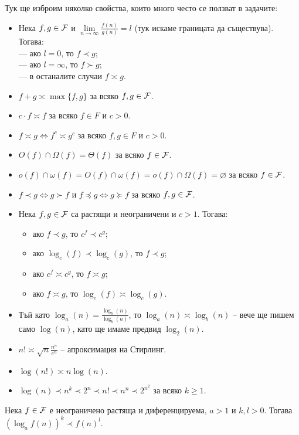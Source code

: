 Тук ще изброим няколко свойства, които много често се ползват в задачите:
\begin{itemize}
  \item Нека $f, g \in \mathcal{F}$ и $\lim\limits_{n \rightarrow \infty} \frac{f(n)}{g(n)} = l$ (тук искаме границата да съществува).
        Тогава: \\
        --- ако $l = 0$, то $f \prec g$; \\
        --- ако $l = \infty$, то $f \succ g$; \\
        --- в останалите случаи $f \asymp g$.
  \item $f + g \asymp \max\{f, g\}$ за всяко $f, g \in \mathcal{F}$.
  \item $c \cdot f \asymp f$ за всяко $f \in F$ и $c > 0$.
  \item $f \asymp g \iff f^c \asymp g^c$ за всяко $f, g \in F$ и $c > 0$.
  \item $O(f) \cap \Omega(f) = \Theta(f)$ за всяко $f \in \mathcal{F}$.
  \item $o(f) \cap \omega(f) = O(f) \cap \omega(f) = o(f) \cap \Omega(f) = \varnothing$ за всяко $f \in \mathcal{F}$.
  \item $f \prec g \iff g \succ f$ и $f \preceq g \iff g \succeq f$ за всяко $f, g \in \mathcal{F}$.
  \item Нека $f, g \in \mathcal{F}$ са растящи и неограничени и $c > 1$. Тогава:
        \begin{itemize}
          \item ако $f \prec g$, то $c^f \prec c^g$;
          \item ако $\log_c(f) \prec \log_c(g)$, то $f \prec g$;
          \item ако $c^f \asymp c^g$, то $f \asymp g$;
          \item ако $f \asymp g$, то $\log_c(f) \asymp \log_c(g)$.
        \end{itemize}
  \item Тъй като $\log_a(n) = \frac{\log_b(n)}{\log_b(a)}$, то $\log_a(n) \asymp \log_b(n)$ -- вече ще пишем само $\log(n)$, като ще имаме предвид $\log_2(n)$.
  \item $n! \asymp \sqrt{n} \frac{n^n}{e^n}$ -- апроксимация на Стирлинг.
  \item $\log(n!) \asymp n \log(n)$.
  \item $\log(n) \prec n^k \prec 2^n \prec n! \prec n^n \prec 2^{n^2}$ за всяко $k \geq 1$.
\end{itemize}

\newpage

\begin{claim}
  Нека $f \in \mathcal{F}$ е неограничено растяща и диференцируема, $a > 1$ и $k, l > 0$.
  Тогава $(\log_a f(n))^{k} \prec f(n)^{l}$.
\end{claim}

